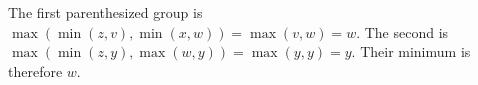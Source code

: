 The first parenthesized group is $\max(\min(z,v),\min(x,w))=\max(v,w)=w$. The second is $\max(\min(z,y),\max(w,y))=\max(y,y)=y$. Their minimum is therefore $\boxed w$.
